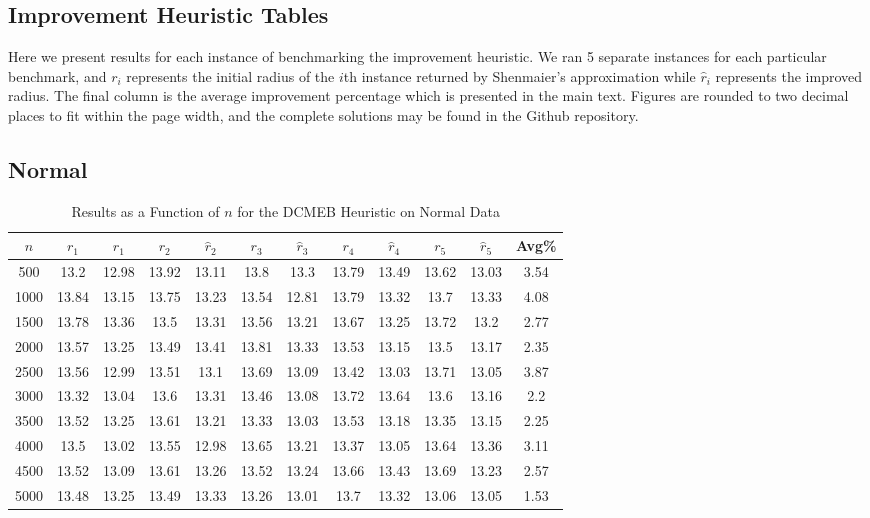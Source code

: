 \documentclass[11pt,twoside]{report}
\theoremstyle{definition}
\numberwithin{theorem}{section}
\numberwithin{definition}{section}
\numberwithin{lemma}{section}
\numberwithin{proposition}{section}
\numberwithin{equation}{section}
\numberwithin{figure}{section}
\begin{document}
\begin{appendices}
    \clearpage
    
    \section{Improvement Heuristic Tables}\label{app:impr_tables}
    Here we present results for each instance of benchmarking the improvement heuristic. We ran 5 separate instances for each particular benchmark, and $r_i$ represents the initial radius of the $i$th instance returned by Shenmaier's approximation while $\hat{r}_i$ represents the improved radius. The final column is the average improvement percentage which is presented in the main text. Figures are rounded to two decimal places to fit within the page width, and the complete solutions may be found in the Github repository.
    
    \subsection{Normal}
    \begin{table}[ht]
        \centering
        \begin{tabular}{|c||cc||cc||cc||cc||cc||c|} \hline
            $n$&$r_1$&$\hat{r}_1$&$r_2$&$\hat{r}_2$&$r_3$&$\hat{r}_3$&$r_4$&$\hat{r}_4$&$r_5$&$\hat{r}_5$&Avg\% \\ \hline
            500&13.2&12.98&13.92&13.11&13.8&13.3&13.79&13.49&13.62&13.03&3.54 \\
            1000&13.84&13.15&13.75&13.23&13.54&12.81&13.79&13.32&13.7&13.33&4.08 \\
            1500&13.78&13.36&13.5&13.31&13.56&13.21&13.67&13.25&13.72&13.2&2.77 \\
            2000&13.57&13.25&13.49&13.41&13.81&13.33&13.53&13.15&13.5&13.17&2.35 \\
            2500&13.56&12.99&13.51&13.1&13.69&13.09&13.42&13.03&13.71&13.05&3.87 \\
            3000&13.32&13.04&13.6&13.31&13.46&13.08&13.72&13.64&13.6&13.16&2.2 \\
            3500&13.52&13.25&13.61&13.21&13.33&13.03&13.53&13.18&13.35&13.15&2.25 \\
            4000&13.5&13.02&13.55&12.98&13.65&13.21&13.37&13.05&13.64&13.36&3.11 \\
            4500&13.52&13.09&13.61&13.26&13.52&13.24&13.66&13.43&13.69&13.23&2.57 \\
            5000&13.48&13.25&13.49&13.33&13.26&13.01&13.7&13.32&13.06&13.05&1.53 \\ \hline
        \end{tabular}
        \caption{Results as a Function of $n$ for the DCMEB Heuristic on Normal Data}
        \label{tab:normal_dcmeb_table_n}
    \end{table}
    

\end{appendices}
\end{document}
